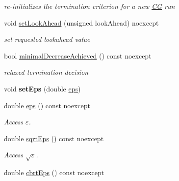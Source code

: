 \begin{DoxyCompactItemize}
\begin{DoxyCompactList}\small\item\em re-\/initializes the termination criterion for a new \hyperlink{namespaceSpacy_1_1CG}{CG} run \end{DoxyCompactList}\item 
void \hyperlink{classSpacy_1_1CG_1_1Termination_1_1StrakosTichyEnergyError_ac40343f544b7e2bfeffa7f7927cfeac5}{set\+Look\+Ahead} (unsigned look\+Ahead) noexcept
\begin{DoxyCompactList}\small\item\em set requested lookahead value \end{DoxyCompactList}\item 
bool \hyperlink{classSpacy_1_1CG_1_1Termination_1_1StrakosTichyEnergyError_af13fec942d9d9ec622803e226537ffec}{minimal\+Decrease\+Achieved} () const noexcept
\begin{DoxyCompactList}\small\item\em relaxed termination decision \end{DoxyCompactList}\item 
void {\bfseries set\+Eps} (double \hyperlink{classSpacy_1_1Mixin_1_1Eps_a40e2ba8f3abd2b5370ef41238cfaaf8b}{eps})\hypertarget{classSpacy_1_1Mixin_1_1Eps_a1bbfd62541610d5d80f2782ab77158e4}{}\label{classSpacy_1_1Mixin_1_1Eps_a1bbfd62541610d5d80f2782ab77158e4}

\item 
double \hyperlink{classSpacy_1_1Mixin_1_1Eps_a40e2ba8f3abd2b5370ef41238cfaaf8b}{eps} () const noexcept\hypertarget{classSpacy_1_1Mixin_1_1Eps_a40e2ba8f3abd2b5370ef41238cfaaf8b}{}\label{classSpacy_1_1Mixin_1_1Eps_a40e2ba8f3abd2b5370ef41238cfaaf8b}

\begin{DoxyCompactList}\small\item\em Access $\varepsilon$. \end{DoxyCompactList}\item 
double \hyperlink{classSpacy_1_1Mixin_1_1Eps_a29e8c25dc3f1fdede57b8eb06f520fe1}{sqrt\+Eps} () const noexcept\hypertarget{classSpacy_1_1Mixin_1_1Eps_a29e8c25dc3f1fdede57b8eb06f520fe1}{}\label{classSpacy_1_1Mixin_1_1Eps_a29e8c25dc3f1fdede57b8eb06f520fe1}

\begin{DoxyCompactList}\small\item\em Access $\sqrt\varepsilon$. \end{DoxyCompactList}\item 
double \hyperlink{classSpacy_1_1Mixin_1_1Eps_a1879ebbf1b467cb4be36bcc63307018d}{cbrt\+Eps} () const noexcept\hypertarget{classSpacy_1_1Mixin_1_1Eps_a1879ebbf1b467cb4be36bcc63307018d}{}\label{classSpacy_1_1Mixin_1_1Eps_a1879ebbf1b467cb4be36bcc63307018d}


\end{DoxyCompactItemize}
